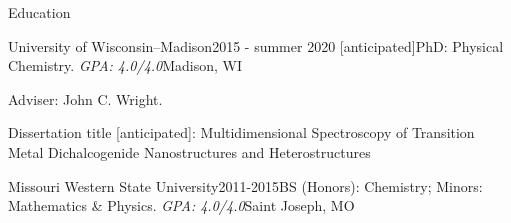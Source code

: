 \documentclass{resume} %
\begin{document}
\begin{rSection}{Education}

\begin{rSubsection}{University of Wisconsin--Madison}{2015 - summer 2020 [anticipated]}{PhD: Physical Chemistry. \emph{GPA: 4.0/4.0}}{Madison, WI}
\item Adviser: John C. Wright.
\item Dissertation title [anticipated]: Multidimensional Spectroscopy of Transition Metal Dichalcogenide Nanostructures and Heterostructures
\end{rSubsection}

\begin{rSubsectionlistless}{Missouri Western State University}{2011-2015}{BS (Honors): Chemistry; Minors: Mathematics \& Physics. \emph{GPA: 4.0/4.0}}{Saint Joseph, MO} 
\end{rSubsectionlistless}



\end{rSection}
\end{document}
